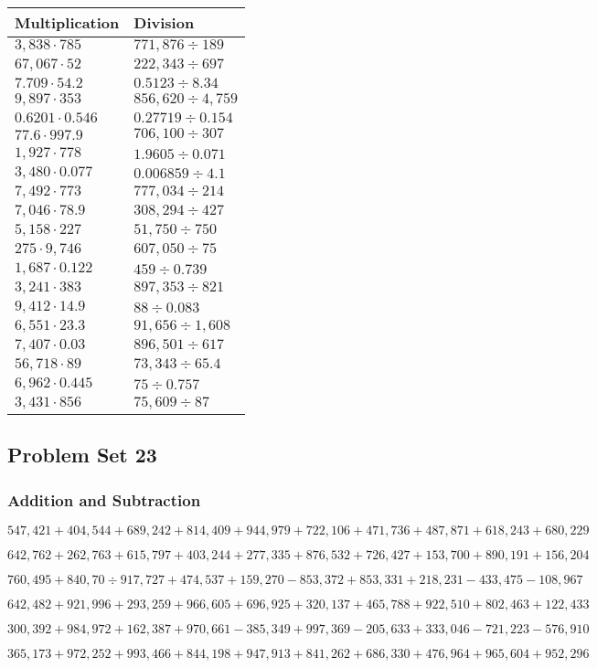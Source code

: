 \begin{longtable}[]{@{}ll@{}}
\toprule
Multiplication & Division\tabularnewline
\midrule
\endhead
\(3,838\cdot785\) & \(771,876÷189\)\tabularnewline
\(67,067\cdot52\) & \(222,343÷697\)\tabularnewline
\(7.709\cdot54.2\) & \(0.5123÷8.34\)\tabularnewline
\(9,897\cdot353\) & \(856,620÷4,759\)\tabularnewline
\(0.6201\cdot0.546\) & \(0.27719÷0.154\)\tabularnewline
\(77.6\cdot997.9\) & \(706,100÷307\)\tabularnewline
\(1,927\cdot778\) & \(1.9605÷0.071\)\tabularnewline
\(3,480\cdot0.077\) & \(0.006859÷4.1\)\tabularnewline
\(7,492\cdot773\) & \(777,034÷214\)\tabularnewline
\(7,046\cdot78.9\) & \(308,294÷427\)\tabularnewline
\(5,158\cdot227\) & \(51,750÷750\)\tabularnewline
\(275\cdot9,746\) & \(607,050÷75\)\tabularnewline
\(1,687\cdot0.122\) & \(459÷0.739\)\tabularnewline
\(3,241\cdot383\) & \(897,353÷821\)\tabularnewline
\(9,412\cdot14.9\) & \(88÷0.083\)\tabularnewline
\(6,551\cdot23.3\) & \(91,656÷1,608\)\tabularnewline
\(7,407\cdot0.03\) & \(896,501÷617\)\tabularnewline
\(56,718\cdot89\) & \(73,343÷65.4\)\tabularnewline
\(6,962\cdot0.445\) & \(75÷0.757\)\tabularnewline
\(3,431\cdot856\) & \(75,609÷87\)\tabularnewline
\bottomrule
\end{longtable}

\hypertarget{problem-set-23-5}{%
\subsection{Problem Set 23}\label{problem-set-23-5}}

\hypertarget{addition-and-subtraction-328}{%
\subsubsection{Addition and
Subtraction}\label{addition-and-subtraction-328}}

\(547,421+404,544+689,242+814,409+944,979+722,106+471,736+487,871+618,243+ 680,229\)

\(642,762+262,763+615,797+403,244+277,335+876,532+726,427+153,700+890,191+156,204\)

\(760,495+840,70÷917,727+474,537+159,270-853,372+853,331+218,231-433,475-108,967\)

\(642,482+921,996+293,259+966,605+696,925+320,137+465,788+922,510+802,463+122,433\)

\(300,392+984,972+162,387+970,661-385,349+997,369-205,633+333,046-721,223-576,910\)

\(365,173+972,252+993,466+844,198+947,913+841,262+686,330+476,964+965,604+952,296\)

